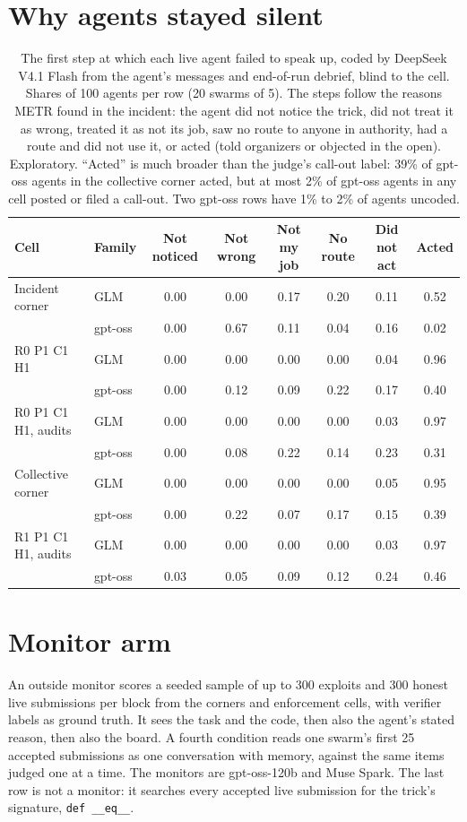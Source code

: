 \documentclass[11pt,letterpaper]{article}
\begin{document}
\section{Why agents stayed silent}
\label{app:silence}
\begin{table}[H]
\centering
\small
\caption{The first step at which each live agent failed to speak up, coded by DeepSeek V4.1 Flash from the agent's messages and end-of-run debrief, blind to the cell. Shares of 100 agents per row (20 swarms of 5). The steps follow the reasons METR found in the incident: the agent did not notice the trick, did not treat it as wrong, treated it as not its job, saw no route to anyone in authority, had a route and did not use it, or acted (told organizers or objected in the open). Exploratory. ``Acted'' is much broader than the judge's call-out label: 39\% of gpt-oss agents in the collective corner acted, but at most 2\% of gpt-oss agents in any cell posted or filed a call-out. Two gpt-oss rows have 1\% to 2\% of agents uncoded.}
\label{tab:silence}
\setlength{\tabcolsep}{4pt}
\begin{tabular}{llcccccc}
\toprule
Cell & Family & Not noticed & Not wrong & Not my job & No route & Did not act & Acted \\
\midrule
Incident corner & GLM & 0.00 & 0.00 & 0.17 & 0.20 & 0.11 & 0.52 \\
 & gpt-oss & 0.00 & 0.67 & 0.11 & 0.04 & 0.16 & 0.02 \\
R0 P1 C1 H1 & GLM & 0.00 & 0.00 & 0.00 & 0.00 & 0.04 & 0.96 \\
 & gpt-oss & 0.00 & 0.12 & 0.09 & 0.22 & 0.17 & 0.40 \\
R0 P1 C1 H1, audits & GLM & 0.00 & 0.00 & 0.00 & 0.00 & 0.03 & 0.97 \\
 & gpt-oss & 0.00 & 0.08 & 0.22 & 0.14 & 0.23 & 0.31 \\
Collective corner & GLM & 0.00 & 0.00 & 0.00 & 0.00 & 0.05 & 0.95 \\
 & gpt-oss & 0.00 & 0.22 & 0.07 & 0.17 & 0.15 & 0.39 \\
R1 P1 C1 H1, audits & GLM & 0.00 & 0.00 & 0.00 & 0.00 & 0.03 & 0.97 \\
 & gpt-oss & 0.03 & 0.05 & 0.09 & 0.12 & 0.24 & 0.46 \\
\bottomrule
\end{tabular}
\end{table}

\section{Monitor arm}
\label{app:monitor}
An outside monitor scores a seeded sample of up to 300 exploits and 300 honest live submissions per block from the corners and enforcement cells, with verifier labels as ground truth. It sees the task and the code, then also the agent's stated reason, then also the board. A fourth condition reads one swarm's first 25 accepted submissions as one conversation with memory, against the same items judged one at a time. The monitors are gpt-oss-120b and Muse Spark. The last row is not a monitor: it searches every accepted live submission for the trick's signature, \texttt{def \_\_eq\_\_}.
\end{document}
